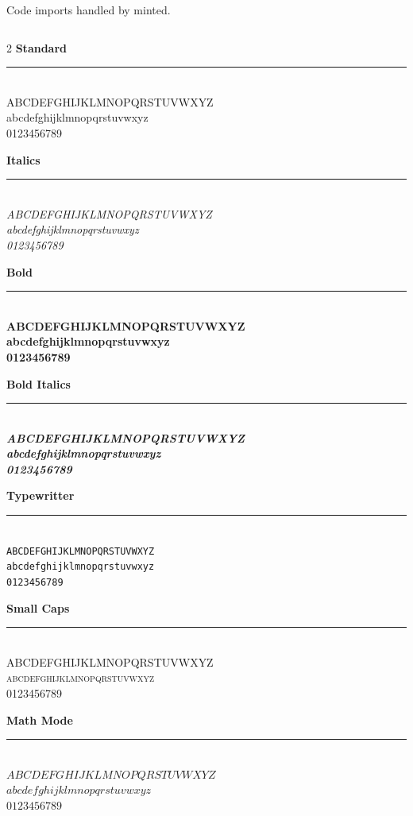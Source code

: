 \documentclass{book}
\newcommand{\Rsampleupp}{ABCDEFGHIJKLMNOPQRSTUVWXYZ}
\newcommand{\Rsamplelow}{abcdefghijklmnopqrstuvwxyz}
\newcommand{\Rsamplenum}{0123456789}
\begin{document}

Code imports handled by minted.
\inputminted{lua}{Rinputif.lua}

\newpage


\begin{multicols}{2}
    \noindent\textbf{Standard}\\
    \rule[1ex]{4cm}{1pt}\\
    \Rsampleupp\\
    \Rsamplelow\\
    \Rsamplenum

    \noindent\textbf{Italics}\\
    \rule[1ex]{4cm}{1pt}\\
    \textit{\Rsampleupp}\\
    \textit{\Rsamplelow}\\
    \textit{\Rsamplenum}

    \noindent\textbf{Bold}\\
    \rule[1ex]{4cm}{1pt}\\
    \textbf{\Rsampleupp}\\
    \textbf{\Rsamplelow}\\
    \textbf{\Rsamplenum}

    \noindent\textbf{Bold Italics}\\
    \rule[1ex]{4cm}{1pt}\\
    \textbf{\textit{\Rsampleupp}}\\
    \textbf{\textit{\Rsamplelow}}\\
    \textbf{\textit{\Rsamplenum}}

    \noindent\textbf{Typewritter}\\
    \rule[1ex]{4cm}{1pt}\\
    \texttt{\Rsampleupp}\\
    \texttt{\Rsamplelow}\\
    \texttt{\Rsamplenum}

\columnbreak

    \noindent\textbf{Small Caps}\\
    \rule[1ex]{4cm}{1pt}\\
    \textsc{\Rsampleupp}\\
    \textsc{\Rsamplelow}\\
    \textsc{\Rsamplenum}

    \noindent\textbf{Math Mode}\\
    \rule[1ex]{4cm}{1pt}\\
    $\Rsampleupp$\\
    $\Rsamplelow$\\
    $\Rsamplenum$


\end{multicols}
\end{document}
